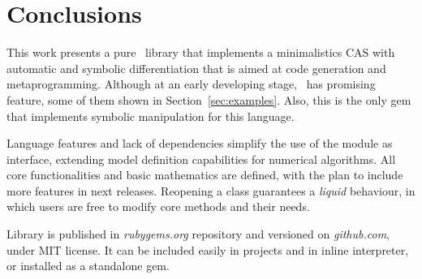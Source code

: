 
\section{Conclusions}
\label{sec:conclusions}

This work presents a pure \Ruby~library that implements a minimalistics CAS with
automatic and symbolic differentiation that is aimed at code generation and metaprogramming.
Although at an early developing stage, \ragnicas~has promising feature, some of them
shown in Section~\ref{sec:examples}. Also, this is the only gem that implements
symbolic manipulation for this language.

Language features and lack of dependencies simplify the use of the module as interface, extending model definition
capabilities for numerical algorithms. All core functionalities and basic mathematics are defined, with the plan to include more features in next releases. Reopening a class guarantees a
\emph{liquid} behaviour, in which users are free to modify core methods and their needs.

Library is published in \emph{rubygems.org} repository and versioned on \emph{github.com}, under MIT license.
It can be included easily in projects and in inline interpreter, or installed as a standalone gem.
